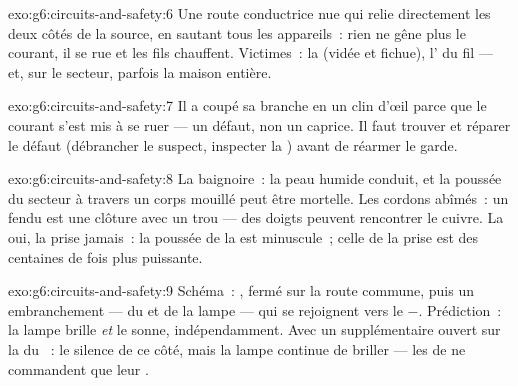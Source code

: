 \begin{solution}{exo:g6:circuits-and-safety:6}
Une route conductrice nue qui relie directement les deux côtés de la
source, en sautant tous les appareils~: rien ne gêne plus le courant,
il se rue et les fils chauffent. Victimes~: la  (vidée et
fichue), l' du fil --- et, sur le secteur, parfois la maison
entière.
\end{solution}

\begin{solution}{exo:g6:circuits-and-safety:7}
Il a coupé sa branche en un clin d'œil parce que le courant s'est mis
à se ruer --- un défaut, non un caprice. Il faut trouver et réparer
le défaut (débrancher le suspect, inspecter la ) avant de
réarmer le garde.
\end{solution}

\begin{solution}{exo:g6:circuits-and-safety:8}
La baignoire~: la peau humide conduit, et la poussée du secteur à
travers un corps mouillé peut être mortelle. Les cordons abîmés~: un
 fendu est une clôture avec un trou --- des doigts peuvent
rencontrer le cuivre. La  oui, la prise jamais~: la poussée de la
 est minuscule~; celle de la prise est des centaines de fois plus
puissante.
\end{solution}

\begin{solution}{exo:g6:circuits-and-safety:9}
Schéma~: ,  fermé sur la route commune, puis un
embranchement ---  du  et  de la lampe --- qui
se rejoignent vers le $-$. Prédiction~: la lampe brille \emph{et} le
 sonne, indépendamment. Avec un  supplémentaire
ouvert sur la  du ~: le silence de ce côté, mais la
lampe continue de briller --- les  de  ne
commandent que leur .
\end{solution}

